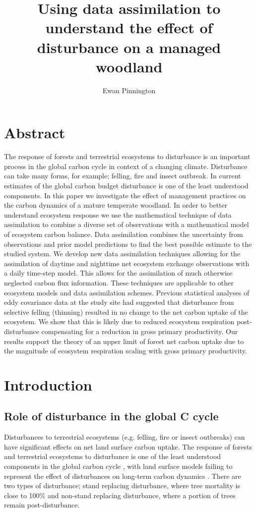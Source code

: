 \documentclass[11pt]{article}
\title{Using data assimilation to understand the effect of disturbance on a managed woodland}
\author{Ewan Pinnington}
\begin{document}
\maketitle


\section*{Abstract}
The response of forests and terrestrial ecosystems to disturbance is an important process in the global carbon cycle in context of a changing climate. Disturbance can take many forms, for example; felling, fire and insect outbreak. In current estimates of the global carbon budget disturbance is one of the least understood components. In this paper we investigate the effect of management practices on the carbon dynamics of a mature temperate woodland. In order to better understand ecosystem response we use the mathematical technique of data assimilation to combine a diverse set of observations with a mathematical model of ecosystem carbon balance. Data assimilation combines the uncertainty from observations and prior model predictions to find the best possible estimate to the studied system. We develop new data assimilation techniques allowing for the assimilation of daytime and nighttime net ecosystem exchange observations with a daily time-step model. This allows for the assimilation of much otherwise neglected carbon flux information. These techniques are applicable to other ecosystem models and data assimilation schemes. Previous statistical analyses of eddy covariance data at the study site had suggested that disturbance from selective felling (thinning) resulted in no change to the net carbon uptake of the ecosystem. We show that this is likely due to reduced ecosystem respiration post-disturbance compensating for a reduction in gross primary productivity. Our results support the theory of an upper limit of forest net carbon uptake due to the magnitude of ecosystem respiration scaling with gross primary productivity.  

\section{Introduction}
\subsection{Role of disturbance in the global C cycle}
Disturbances to terrestrial ecosystems (e.g. felling, fire or insect outbreaks) can have significant effects on net land surface carbon uptake. The response of forests and terrestrial ecosystems to disturbance is one of the least understood components in the global carbon cycle \citep{ciais2014carbon}, with land surface models failing to represent the effect of disturbances on long-term carbon dynamics \citep{running2008ecosystem}. There are two types of disturbance; stand replacing disturbance, where tree mortality is close to 100\% and non-stand replacing disturbance, where a portion of trees remain post-disturbance.
\end{document}
